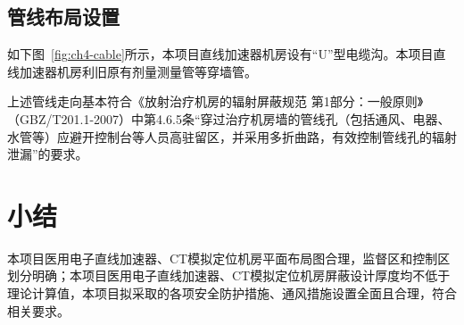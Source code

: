 \subsection{管线布局设置}

如下图~\ref{fig:ch4-cable}所示，本项目直线加速器机房设有“U”型电缆沟。本项目直线加速器机房利旧原有剂量测量管等穿墙管。

上述管线走向基本符合《放射治疗机房的辐射屏蔽规范 第1部分：一般原则》（GBZ/T201.1-2007）中第4.6.5条“穿过治疗机房墙的管线孔（包括通风、电器、水管等）应避开控制台等人员高驻留区，并采用多折曲路，有效控制管线孔的辐射泄漏”的要求。






\section{小结}

本项目医用电子直线加速器、CT模拟定位机房平面布局图合理，监督区和控制区划分明确；本项目医用电子直线加速器、CT模拟定位机房屏蔽设计厚度均不低于理论计算值，本项目拟采取的各项安全防护措施、通风措施设置全面且合理，符合相关要求。
